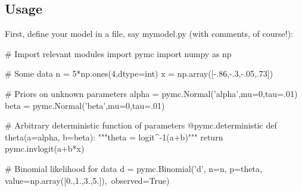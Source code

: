 \documentclass[]{jss}
\begin{document}
% 
% 
% 
% 
% 
% 
% 
% 
% 

\subsection{Usage}
  \label{usage}

First, define your model in a file, say mymodel.py (with comments, of course!):
%
\begin{CodeInput}
# Import relevant modules
import pymc
import numpy as np

# Some data
n = 5*np.ones(4,dtype=int)
x = np.array([-.86,-.3,-.05,.73])

# Priors on unknown parameters
alpha = pymc.Normal('alpha',mu=0,tau=.01)
beta = pymc.Normal('beta',mu=0,tau=.01)

# Arbitrary deterministic function of parameters
@pymc.deterministic
def theta(a=alpha, b=beta):
    """theta = logit^{-1}(a+b)"""
    return pymc.invlogit(a+b*x)

# Binomial likelihood for data
d = pymc.Binomial('d', n=n, p=theta, value=np.array([0.,1.,3.,5.]),\
                  observed=True)
    
\end{CodeInput}
\end{document}
